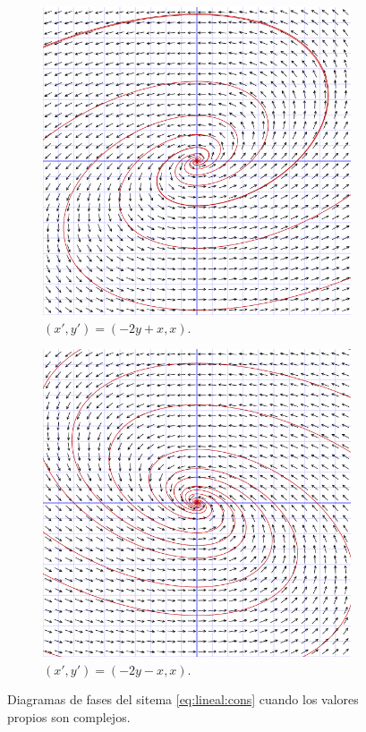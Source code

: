 \begin{enumerate}
\begin{figure}[H]
\begin{subfigure}{.45\textwidth}
      \centering
      \includegraphics[width=.8\textwidth]{./images/fases-espiral+.png}
      \caption{$(x', y') = (-2y+x, x)$.}
      \label{fig:fases:espiral:+}
    \end{subfigure}
    \begin{subfigure}{.45\textwidth}
      \centering
      \includegraphics[width=.8\textwidth]{./images/fases-espiral-.png}
      \caption{$(x', y') = (-2y-x, x)$.}
      \label{fig:fases:espiral:-}
    \end{subfigure}
    \caption{Diagramas de fases del sitema \eqref{eq:lineal:cons} cuando los valores propios son
      complejos.}
  \end{figure}
\end{enumerate}


